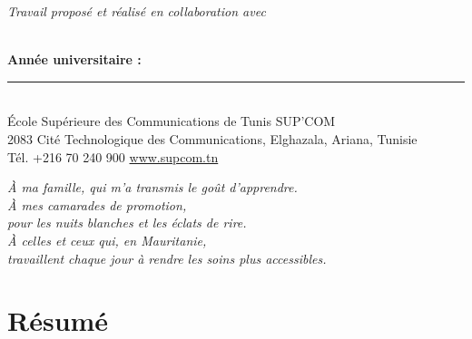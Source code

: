 \documentclass[12pt, a4paper, oneside]{report}
\begin{document}
\begin{titlepage}
\begin{center}
    \textit{Travail proposé et réalisé en collaboration avec}\\[0.4em]
    \textbf{\underline{\hspace{7cm}}}\\
    \vspace{1.5cm}

    \textbf{Année universitaire : \underline{\hspace{3cm}}}\\

    \vfill
    \rule{\linewidth}{0.5pt}\\[0.4em]
    {\footnotesize
      École Supérieure des Communications de Tunis \textbullet{} SUP'COM\\
      2083 Cité Technologique des Communications, Elghazala, Ariana, Tunisie\\
      Tél. +216 70 240 900 \textbullet{} \href{http://www.supcom.tn}{www.supcom.tn}
    }
  \end{center}
\end{titlepage}

\thispagestyle{empty}\null\newpage

\thispagestyle{empty}
\vspace*{3cm}
\begin{flushright}
  \itshape
  À ma famille, qui m'a transmis le goût d'apprendre.\\[0.4em]
  À mes camarades de promotion,\\
  pour les nuits blanches et les éclats de rire.\\[0.4em]
  À celles et ceux qui, en Mauritanie,\\
  travaillent chaque jour à rendre les soins plus accessibles.
\end{flushright}
\newpage

\chapter*{Résumé}
\end{document}
